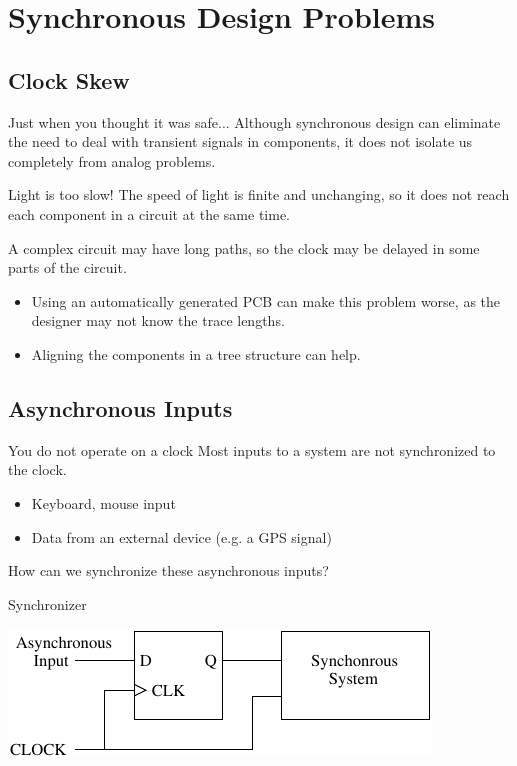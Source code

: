 \section{Synchronous Design Problems}

\subsection{Clock Skew}

\begin{frame}{Just when you thought it was safe...}
  Although synchronous design can eliminate the need to deal with transient signals in components, it does not isolate us completely from analog problems.
  \begin{block}{Light is too slow!}
    The speed of light is finite and unchanging, so it does not reach each component in a circuit at the same time.
  \end{block}
  A complex circuit may have long paths, so the clock may be delayed in some parts of the circuit.
\end{frame}

\begin{itemize}
  \item Using an automatically generated PCB can make this problem worse, as the designer may not know the trace lengths.
  \item Aligning the components in a tree structure can help.
\end{itemize}

\subsection{Asynchronous Inputs}

\begin{frame}{You do not operate on a clock}
  Most inputs to a system are not synchronized to the clock.
  \begin{itemize}
    \item Keyboard, mouse input
    \item Data from an external device (e.g. a GPS signal)
  \end{itemize}
  How can we synchronize these asynchronous inputs?
\end{frame}

\begin{frame}{Synchronizer}
  \begin{center}
    \includegraphics{Synchronizer}
  \end{center}
\end{frame}


